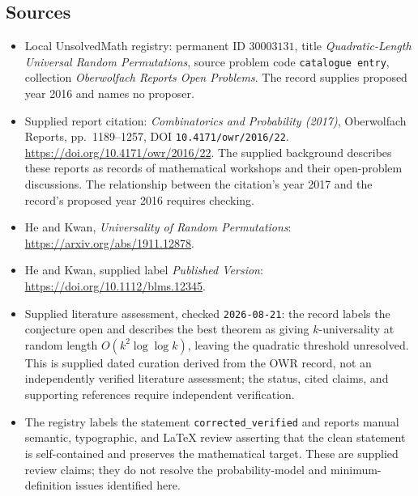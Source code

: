\documentclass[11pt]{article}
\begin{document}
\subsection{Sources}
\begin{itemize}
\item Local UnsolvedMath registry: permanent ID \(30003131\), title \emph{Quadratic-Length Universal Random Permutations}, source problem code \texttt{catalogue entry}, collection \emph{Oberwolfach Reports Open Problems}. The record supplies proposed year 2016 and names no proposer.
\item Supplied report citation: \emph{Combinatorics and Probability (2017)}, Oberwolfach Reports, pp.~1189--1257, DOI \texttt{10.4171/owr/2016/22}. \url{https://doi.org/10.4171/owr/2016/22}. The supplied background describes these reports as records of mathematical workshops and their open-problem discussions. The relationship between the citation's year 2017 and the record's proposed year 2016 requires checking.
\item He and Kwan, \emph{Universality of Random Permutations}: \url{https://arxiv.org/abs/1911.12878}.
\item He and Kwan, supplied label \emph{Published Version}: \url{https://doi.org/10.1112/blms.12345}.
\item Supplied literature assessment, checked \texttt{2026-08-21}: the record labels the conjecture open and describes the best theorem as giving \(k\)-universality at random length \(O(k^2\log\log k)\), leaving the quadratic threshold unresolved. This is supplied dated curation derived from the OWR record, not an independently verified literature assessment; the status, cited claims, and supporting references require independent verification.
\item The registry labels the statement \texttt{corrected\_verified} and reports manual semantic, typographic, and LaTeX review asserting that the clean statement is self-contained and preserves the mathematical target. These are supplied review claims; they do not resolve the probability-model and minimum-definition issues identified here.
\end{itemize}
\end{document}
